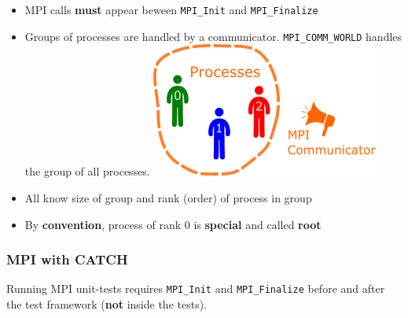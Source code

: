 \begin{itemize}
\item
  MPI calls \textbf{must} appear beween \texttt{MPI\_Init} and
  \texttt{MPI\_Finalize}
\item
  Groups of processes are handled by a communicator.
  \texttt{MPI\_COMM\_WORLD} handles the group of all processes.
  \includegraphics{06MPI/figures/world.png}
\item
  All know size of group and rank (order) of process in group
\item
  By \textbf{convention}, process of rank 0 is \textbf{special} and
  called \textbf{root}
\end{itemize}

\subsubsection{MPI with CATCH}\label{mpi-with-catch}

Running MPI unit-tests requires \texttt{MPI\_Init} and
\texttt{MPI\_Finalize} before and after the test framework (\textbf{not}
inside the tests).

\begin{Shaded}
\begin{Highlighting}[]


\NormalTok{) \{}
     
    \NormalTok{);}
\NormalTok{\}}

   
     
     
\NormalTok{\}}
\end{Highlighting}
\end{Shaded}

